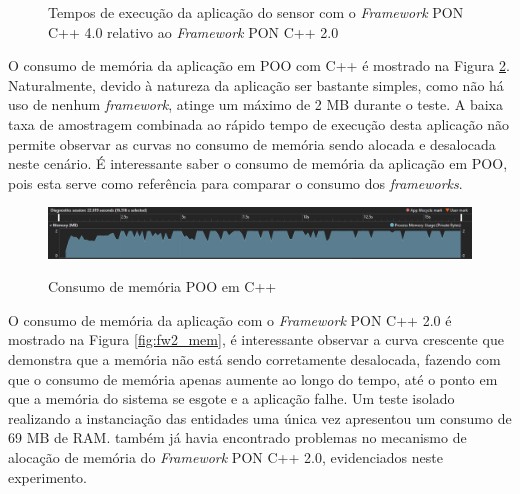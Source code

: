 \begin{figure}[!htb]
  \centering
  \caption{Tempos de execução da aplicação do sensor com o \textit{Framework} PON C++ 4.0 relativo ao \textit{Framework} PON C++ 2.0}
  \label{fig:sensor_bench2}
  \end{figure}

O consumo de memória da aplicação em POO com C++ é mostrado na Figura
\ref{fig:poo_mem}. Naturalmente, devido à natureza da aplicação ser bastante
simples, como não há uso de nenhum \textit{framework}, atinge um máximo de 2 MB
durante o teste. A baixa taxa de amostragem combinada ao rápido tempo de
execução desta aplicação não permite observar as curvas no consumo de memória
sendo alocada e desalocada neste cenário. É interessante saber o consumo de
memória da aplicação em POO, pois esta serve como referência para comparar o
consumo dos \textit{frameworks}.

\begin{figure}[!htb]
\centering
\caption{Consumo de memória POO em C++}
\includegraphics[width=\textwidth]{../figures/poo_mem.png}
\smallskip
{}
\label{fig:poo_mem}
\end{figure}

O consumo de memória da aplicação com o \textit{Framework} PON C++ 2.0 é
mostrado na Figura \ref{fig:fw2_mem}, é interessante observar a curva crescente
que demonstra que a memória não está sendo corretamente desalocada, fazendo com
que o consumo de memória apenas aumente ao longo do tempo, até o ponto em que a
memória do sistema se esgote e a aplicação falhe. Um teste isolado realizando a
instanciação das entidades uma única vez apresentou um consumo de 69 MB de RAM.
 também já havia encontrado problemas no mecanismo
de alocação de memória do \textit{Framework} PON C++ 2.0, evidenciados neste
experimento.


